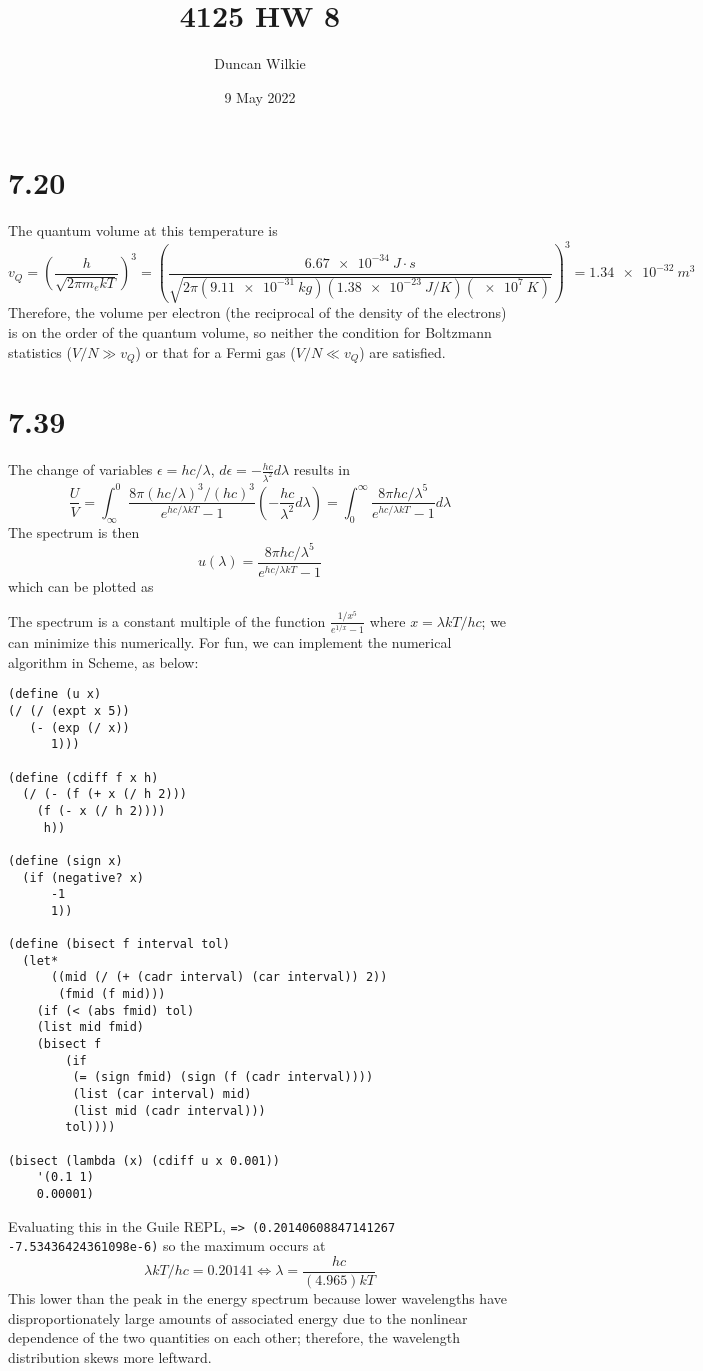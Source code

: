 \documentclass{article}
\title{4125 HW 8}
\author{Duncan Wilkie}
\date{9 May 2022}
\begin{document}
\maketitle

\section*{7.20}
The quantum volume at this temperature is
\[
  v_{Q}=\left( \frac{h}{\sqrt{2\pi m_{e}kT}} \right)^{3}
  =\left( \frac{\SI{6.67e-34}{J\cdot s}}{\sqrt{2\pi (\SI{9.11e-31}{kg})(\SI{1.38e-23}{J/K})(\SI{e7}{K})}} \right)^{3}
  =\SI{1.34e-32}{m^{3}}
\]
Therefore, the volume per electron (the reciprocal of the density of the electrons) is on the order of the quantum volume,
so neither the condition for Boltzmann statistics ($V/N\gg v_{Q}$) or that for a Fermi gas ($V/N\ll v_{Q}$) are satisfied.

\section*{7.39}
The change of variables $\epsilon=hc/\lambda$, $d\epsilon=-\frac{hc}{\lambda^{2}}d\lambda$ results in
\[
  \frac{U}{V}=\int_{\infty}^{0}\frac{8\pi(hc/\lambda)^{3}/(hc)^{3}}{e^{hc/\lambda kT}-1}\left( -\frac{hc}{\lambda^{2}}d\lambda \right)
  =\int_{0}^{\infty}\frac{8\pi hc/\lambda^{5}}{e^{hc/\lambda kT}-1}d\lambda
\]
The spectrum is then
\[
  u(\lambda)=\frac{8\pi hc/\lambda^{5}}{e^{hc/\lambda kT}-1}
\]
which can be plotted as
\begin{center}

\end{center}
The spectrum is a constant multiple of the function $\frac{1/x^{5}}{e^{1/x}-1}$ where $x=\lambda kT/hc$; we can minimize this numerically.
For fun, we can implement the numerical algorithm in Scheme, as below:
\begin{verbatim}
(define (u x)
(/ (/ (expt x 5))
   (- (exp (/ x))
      1)))

(define (cdiff f x h)
  (/ (- (f (+ x (/ h 2)))
	(f (- x (/ h 2))))
     h))

(define (sign x)
  (if (negative? x)
      -1
      1))

(define (bisect f interval tol)
  (let*
      ((mid (/ (+ (cadr interval) (car interval)) 2))
       (fmid (f mid)))
    (if (< (abs fmid) tol)
	(list mid fmid)
	(bisect f
		(if
		 (= (sign fmid) (sign (f (cadr interval))))
		 (list (car interval) mid)
		 (list mid (cadr interval)))
		tol))))

(bisect (lambda (x) (cdiff u x 0.001))
	'(0.1 1)
	0.00001)
\end{verbatim}
Evaluating this in the Guile REPL, \newline
\verb|=> (0.20140608847141267 -7.53436424361098e-6)| \newline
so the maximum occurs at
\[
  \lambda kT/hc=0.20141
  \Leftrightarrow \lambda=\frac{hc}{(4.965)kT}
\]
This lower than the peak in the energy spectrum because lower wavelengths have disproportionately large amounts of associated energy
due to the nonlinear dependence of the two quantities on each other; therefore, the wavelength distribution skews more leftward.
\end{document}
